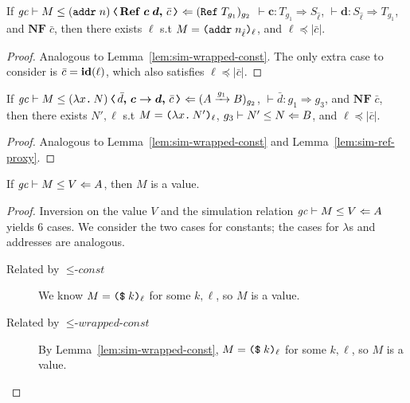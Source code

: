 \begin{lemma}
\label{lem:sim-ref-proxy}
If $\simrel{\gc}{M}{\cccast{(\ccaddr{n})}{\coerc{\refco{\bm{c}}{\bm{d}}}{\bar{c}}}}{(\Refer{T_{g_1}})_{g_2}}$
$\vdash \bm{c} : T_{g_1} \Rightarrow S_{\hat{\ell}}$, $\vdash \bm{d} : S_{\hat{\ell}} \Rightarrow T_{g_1}$,
and $\mathbf{NF}\;\bar{c}$, then there exists $\ell$ s.t $M = \text{\texttt{{(addr}}}\;{n_{\hat{\ell}}}\text{\texttt{{)}}}_{\ell}$,
and $\ell \preccurlyeq |\bar{c}|$.
\end{lemma}
\begin{proof}
Analogous to Lemma~\ref{lem:sim-wrapped-const}. The only extra case to consider
is $\bar{c} = \mathit{\mathbf{id}}(\ell)$, which also satisfies $\ell \preccurlyeq |\bar{c}|$.
\end{proof}

\begin{lemma}
\label{lem:sim-func-proxy}
If $\simrel{\gc}{M}{\cccast{(\cclam{x}{N})}{\coerc{\funco{\bar{d}}{\bm{c}}{\bm{d}}}{\bar{c}}}}{(\Fun{A}{g_1}{B})_{g_2}}$,
$\vdash \bar{d} : g_1 \Rightarrow g_3$,
and $\mathbf{NF}\;\bar{c}$, then there exists $N', \ell$ s.t $M = \text{\texttt{{(${\lambda}$}}}{x}\text{\texttt{{.}}}\,{N'}\text{\texttt{{)}}}_{\ell}$,
${g_3}\vdash{N'}\leq{N}\Leftarrow{B}$, and $\ell \preccurlyeq |\bar{c}|$.
\end{lemma}
\begin{proof}
Analogous to Lemma~\ref{lem:sim-wrapped-const} and Lemma~\ref{lem:sim-ref-proxy}.
\end{proof}

\begin{lemma}
\label{lem:sim-val}
If ${\mathit{gc}}\vdash{M}\leq{V}\Leftarrow{A}$, then $M$ is a value.
\end{lemma}
\begin{proof}
Inversion on the value $V$ and the simulation relation ${\mathit{gc}}\vdash{M}\leq{V}\Leftarrow{A}$ yields 6 cases.
We consider the two cases for constants; the cases for $\lambda$s and addresses are analogous.
\begin{description}
\item[Related by ${\leq}\textit{-const}$] We know $M = \text{\texttt{{(\$}}}\;{k}\text{\texttt{{)}}}_{\ell}$ for some $k, \ell$,
so $M$ is a value.
\item[Related by ${\leq}\textit{-wrapped-const}$] By Lemma~\ref{lem:sim-wrapped-const},
$M = \text{\texttt{{(\$}}}\;{k}\text{\texttt{{)}}}_{\ell}$ for some $k, \ell$, so $M$ is a value.
\end{description}
\end{proof}

